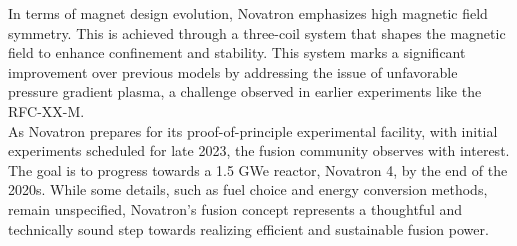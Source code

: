 In terms of magnet design evolution, Novatron emphasizes high magnetic field symmetry. This is achieved through a three-coil system that shapes the magnetic field to enhance confinement and stability. This system marks a significant improvement over previous models by addressing the issue of unfavorable pressure gradient plasma, a challenge observed in earlier experiments like the RFC-XX-M.\\

As Novatron prepares for its proof-of-principle experimental facility, with initial experiments scheduled for late 2023, the fusion community observes with interest. The goal is to progress towards a 1.5 GWe reactor, Novatron 4, by the end of the 2020s. While some details, such as fuel choice and energy conversion methods, remain unspecified, Novatron's fusion concept represents a thoughtful and technically sound step towards realizing efficient and sustainable fusion power.
